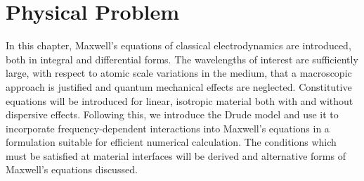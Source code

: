 \chapter{Physical Problem}
\label{PhysicalProblemChapter}
 In this chapter, Maxwell's equations
of classical electrodynamics are introduced, both in integral and differential
forms. The wavelengths of interest are sufficiently large, with respect to
atomic scale variations in the medium, that a macroscopic approach is justified
and quantum mechanical effects are neglected. Constitutive equations will be
introduced for linear, isotropic material both with and without dispersive
effects. Following this, we introduce the Drude model and use it to incorporate
frequency-dependent interactions into Maxwell's equations in a formulation
suitable for efficient numerical calculation. The conditions which must be
satisfied at material interfaces will be derived and alternative forms of
Maxwell's equations discussed.

